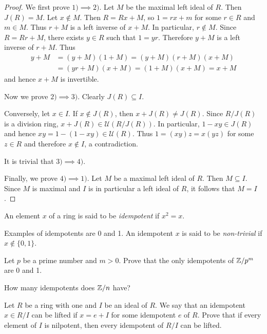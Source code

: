 \begin{proof}
    We first prove $1)\implies2)$. Let $M$ be the maximal left ideal of $R$. Then $J(R)=M$. 
    Let $x\not\in M$. Then $R=Rx+M$, so $1=rx+m$ for some $r\in R$ and $m\in M$. Thus  
    $r+M$ is a left inverse of $x+M$. In particular, 
    $r\not\in M$. Since $R=Rr+M$, there exists $y\in R$ such that $1=yr$. Therefore
    $y+M$ is a left inverse of $r+M$. Thus 
    \begin{align*}
    y+M&=(y+M)(1+M)=(y+M)(r+M)(x+M)\\
    &=(yr+M)(x+M)=(1+M)(x+M)=x+M
    \end{align*}
    and hence $x+M$ is invertible. 

    Now we prove $2)\implies3)$. Clearly $J(R)\subseteq I$. 
    
    Conversely, let $x\in I$. If $x\not\in J(R)$, then
    $x+J(R)\ne J(R)$. Since $R/J(R)$ is a division ring, 
    $x+J(R)\in\mathcal{U}(R/J(R))$. In particular, $1-xy\in J(R)$ and hence 
    $xy=1-(1-xy)\in\mathcal{U}(R)$. Thus $1=(xy)z=x(yz)$ for some $z\in R$ and therefore $x\not\in I$, a contradiction. 
    
    It is trivial that $3)\implies4)$. 

    Finally, we prove $4)\implies 1)$. 
    Let $M$ be a maximal left ideal of $R$. Then $M\subseteq I$. Since $M$ 
    is maximal and $I$ is in particular a left ideal of $R$, 
    it follows that $M=I$. 
\end{proof}

\begin{definition}
    An element $x$ of a ring is said to be \emph{idempotent} 
    if $x^2=x$.   
\end{definition}

Examples of idempotents are 0 and 1. 
An idempotent $x$ is said to be \emph{non-trivial} if $x\not\in\{0,1\}$. 

\begin{exercise}
\label{xca:idempotents_modpm}
    Let $p$ be a prime number and $m>0$. 
    Prove that the only idempotents of $\mathbb{Z}/p^m$ are 0 and 1. 
\end{exercise}


\begin{exercise}
    \label{xca:idempotents_modn}
    How many idempotents does $\mathbb{Z}/n$ have?
\end{exercise}

\begin{exercise}
\label{xca:lifting_idempotents}
    Let $R$ be a ring with one and $I$ be an ideal of $R$. 
    We say that an idempotent $x\in R/I$ can be lifted if $x=e+I$ for
    some idempotent $e$ of $R$. 
    Prove that if every element of $I$ is nilpotent, then every 
    idempotent of $R/I$ can be lifted. 
\end{exercise}

